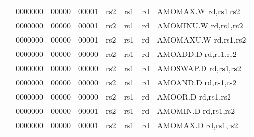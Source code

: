 \begin{table}[p]
\begin{small}
\begin{center}
\begin{tabular}{rcccccccccl}
&
\multicolumn{1}{|c|}{0000000} &
\multicolumn{3}{c|}{00000} &
\multicolumn{2}{c|}{00001} &
\multicolumn{1}{c|}{rs2} &
\multicolumn{1}{c|}{rs1} &
\multicolumn{1}{c|}{rd} & AMOMAX.W rd,rs1,rs2 \\
\cline{2-10}
  

&
\multicolumn{1}{|c|}{0000000} &
\multicolumn{3}{c|}{00000} &
\multicolumn{2}{c|}{00001} &
\multicolumn{1}{c|}{rs2} &
\multicolumn{1}{c|}{rs1} &
\multicolumn{1}{c|}{rd} & AMOMINU.W rd,rs1,rs2 \\
\cline{2-10}
  

&
\multicolumn{1}{|c|}{0000000} &
\multicolumn{3}{c|}{00000} &
\multicolumn{2}{c|}{00001} &
\multicolumn{1}{c|}{rs2} &
\multicolumn{1}{c|}{rs1} &
\multicolumn{1}{c|}{rd} & AMOMAXU.W rd,rs1,rs2 \\
\cline{2-10}
  

&
\multicolumn{1}{|c|}{0000000} &
\multicolumn{3}{c|}{00000} &
\multicolumn{2}{c|}{00000} &
\multicolumn{1}{c|}{rs2} &
\multicolumn{1}{c|}{rs1} &
\multicolumn{1}{c|}{rd} & AMOADD.D rd,rs1,rs2 \\
\cline{2-10}
  

&
\multicolumn{1}{|c|}{0000000} &
\multicolumn{3}{c|}{00000} &
\multicolumn{2}{c|}{00000} &
\multicolumn{1}{c|}{rs2} &
\multicolumn{1}{c|}{rs1} &
\multicolumn{1}{c|}{rd} & AMOSWAP.D rd,rs1,rs2 \\
\cline{2-10}
  

&
\multicolumn{1}{|c|}{0000000} &
\multicolumn{3}{c|}{00000} &
\multicolumn{2}{c|}{00000} &
\multicolumn{1}{c|}{rs2} &
\multicolumn{1}{c|}{rs1} &
\multicolumn{1}{c|}{rd} & AMOAND.D rd,rs1,rs2 \\
\cline{2-10}
  

&
\multicolumn{1}{|c|}{0000000} &
\multicolumn{3}{c|}{00000} &
\multicolumn{2}{c|}{00000} &
\multicolumn{1}{c|}{rs2} &
\multicolumn{1}{c|}{rs1} &
\multicolumn{1}{c|}{rd} & AMOOR.D rd,rs1,rs2 \\
\cline{2-10}
  

&
\multicolumn{1}{|c|}{0000000} &
\multicolumn{3}{c|}{00000} &
\multicolumn{2}{c|}{00001} &
\multicolumn{1}{c|}{rs2} &
\multicolumn{1}{c|}{rs1} &
\multicolumn{1}{c|}{rd} & AMOMIN.D rd,rs1,rs2 \\
\cline{2-10}
  

&
\multicolumn{1}{|c|}{0000000} &
\multicolumn{3}{c|}{00000} &
\multicolumn{2}{c|}{00001} &
\multicolumn{1}{c|}{rs2} &
\multicolumn{1}{c|}{rs1} &
\multicolumn{1}{c|}{rd} & AMOMAX.D rd,rs1,rs2 \\
\cline{2-10}
  


\end{tabular}
\end{center}
\end{small}
\end{table}
